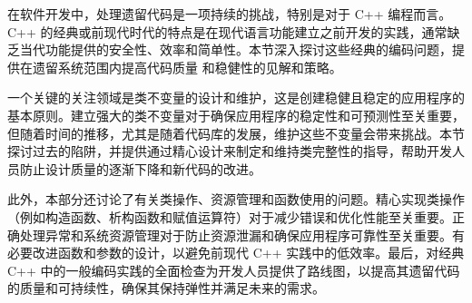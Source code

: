 在软件开发中，处理遗留代码是一项持续的挑战，特别是对于 C++ 编程而言。C++ 的经典或前现代时代的特点是在现代语言功能建立之前开发的实践，通常缺乏当代功能提供的安全性、效率和简单性。本节深入探讨这些经典的编码问题，提供在遗留系统范围内提高代码质量 和稳健性的见解和策略。

一个关键的关注领域是类不变量的设计和维护，这是创建稳健且稳定的应用程序的基本原则。建立强大的类不变量对于确保应用程序的稳定性和可预测性至关重要，但随着时间的推移，尤其是随着代码库的发展，维护这些不变量会带来挑战。本节探讨过去的陷阱，并提供通过精心设计来制定和维持类完整性的指导，帮助开发人员防止设计质量的逐渐下降和新代码的改进。

此外，本部分还讨论了有关类操作、资源管理和函数使用的问题。精心实现类操作（例如构造函数、析构函数和赋值运算符）对于减少错误和优化性能至关重要。正确处理异常和系统资源管理对于防止资源泄漏和确保应用程序可靠性至关重要。有必要改进函数和参数的设计，以避免前现代 C++ 实践中的低效率。最后，对经典 C++ 中的一般编码实践的全面检查为开发人员提供了路线图，以提高其遗留代码的质量和可持续性，确保其保持弹性并满足未来的需求。
